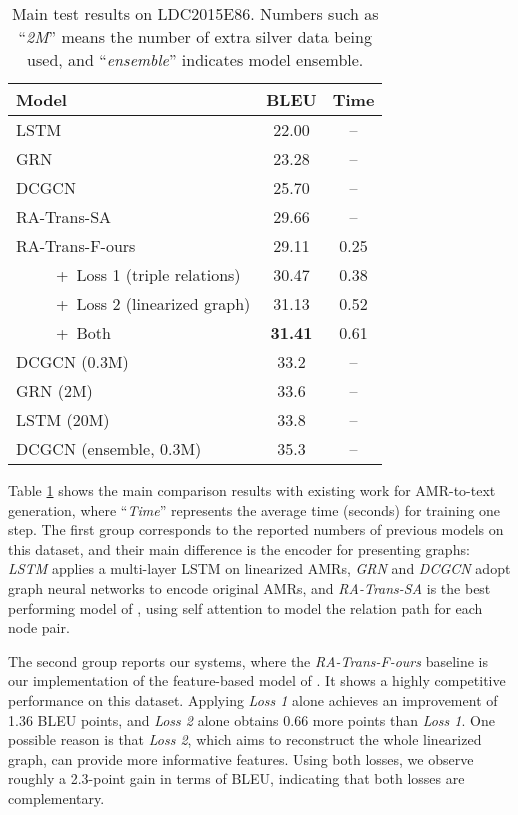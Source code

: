 \documentclass[11pt,a4paper]{article}
\begin{document}
\begin{table}
\setlength\tabcolsep{4pt}
    \centering
    \begin{tabular}{lcc}
    \toprule
    Model & BLEU & Time \\
    \midrule
    LSTM \citep{konstas2017neural} & 22.00 & -- \\
    GRN \citep{song2018graph} & 23.28 & -- \\
    DCGCN \citep{guo2019densely} & 25.70 & -- \\
    RA-Trans-SA \citep{zhu2019modeling} & 29.66 & -- \\
    \hline
    RA-Trans-F-ours & 29.11 & 0.25 \\
    ~~~~~+~Loss 1 (triple relations) & 30.47 & 0.38 \\
    ~~~~~+~Loss 2 (linearized graph) & 31.13 & 0.52 \\
    ~~~~~+~Both & \textbf{31.41} & 0.61 \\
    \hline
    DCGCN (0.3M) & 33.2 & -- \\
    GRN (2M) & 33.6 & -- \\
    LSTM (20M) & 33.8 & -- \\
    DCGCN (ensemble, 0.3M) & 35.3 & -- \\
    \bottomrule
    \end{tabular}
    \caption{Main test results on LDC2015E86. Numbers such as ``\emph{2M}'' means the number of extra silver data being used, and ``\emph{ensemble}'' indicates model ensemble.}
    \label{tab:main}
    \vspace{-0.5em}
\end{table}


Table \ref{tab:main} shows the main comparison results with existing work for AMR-to-text generation, where ``\emph{Time}'' represents the average time (seconds) for training one step.
The first group corresponds to the reported numbers of previous models on this dataset, and their main difference is the encoder for presenting graphs:
\emph{LSTM} \citep{konstas2017neural} applies a multi-layer LSTM on linearized AMRs, \emph{GRN} \citep{song2018graph} and \emph{DCGCN} \citep{guo2019densely} adopt graph neural networks to encode original AMRs, and \emph{RA-Trans-SA} is the best performing model of \citet{zhu2019modeling}, 
using self attention to model the relation path for each node pair.


The second group reports our systems, where the \emph{RA-Trans-F-ours} baseline is our implementation of the feature-based model of \citet{zhu2019modeling}.
It shows a highly competitive performance on this dataset.
Applying \emph{Loss 1} alone achieves an improvement of 1.36 BLEU points, and \emph{Loss 2} alone obtains 0.66 more points than \emph{Loss 1}.
One possible reason is that \emph{Loss 2}, which aims to reconstruct the whole linearized graph, can provide more informative features.
Using both losses, we observe roughly a 2.3-point gain in terms of BLEU, indicating that both losses are complementary.
\end{document}
